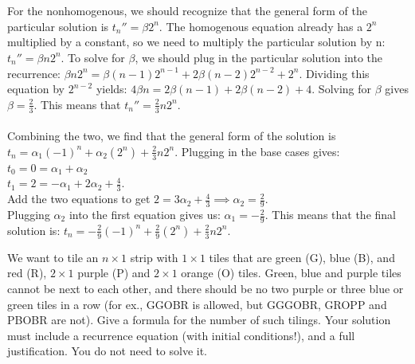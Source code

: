 \documentclass[11pt]{article}
\begin{document}
\begin{solution}
	\\\\ For the nonhomogenous, we should recognize that the general form of the particular solution is $t_n'' = \beta 2^{n}$. The homogenous equation already has a $2^n$ multiplied by a constant, so we need to multiply the particular solution by n: $t_n'' = \beta n2^{n}$. To solve for $\beta$, we should plug in the particular solution into the recurrence: $\beta n2^n = \beta(n-1)2^{n-1} + 2\beta(n-2)2^{n-2} + 2^n$. Dividing this equation by $2^{n-2}$ yields: $4\beta n = 2\beta(n-1) + 2\beta (n-2) + 4$. Solving for $\beta$ gives $\beta = \frac{2}{3}$. This means that $t_n'' = \frac{2}{3}n 2^n$.
	\\\\ Combining the two, we find that the general form of the solution is $t_n = \alpha_1 (-1)^n + \alpha_2 (2^n) + \frac{2}{3}n2^n$. Plugging in the base cases gives:
	\\ $t_0 = 0 = \alpha_1 + \alpha_2$
	\\ $t_1 = 2 = -\alpha_1 + 2\alpha_2 + \frac{4}{3}$.
	\\ Add the two equations to get $2 = 3 \alpha_2 + \frac{4}{3} \implies \alpha_2 = \frac{2}{9}$.
	\\ Plugging $\alpha_2$ into the first equation gives us: $\alpha_1 = -\frac{2}{9}$. This means that the final solution is: $t_n = -\frac{2}{9}(-1)^n + \frac{2}{9}(2^n) + \frac{2}{3}n2^n$.

	\end{solution}

\newpage
\begin{problem}
	We want to tile an $n\times 1$ strip with $1\times 1$ tiles that are green (G), blue (B), and red (R), $2\times 1$ purple (P) and $2\times 1$ orange (O) tiles. Green, blue and purple tiles cannot be next to each other, and there should be no two purple or three blue or green tiles in a row (for ex., GGOBR is allowed, but GGGOBR, GROPP and PBOBR are not). Give a formula for the number of such tilings. Your solution must include a recurrence equation (with initial conditions!), and a full justification. You do not need to solve it. 
\end{problem}
\end{document}
